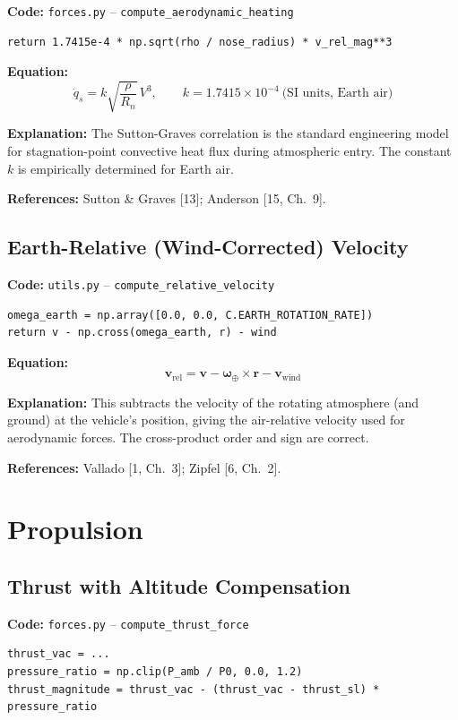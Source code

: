 \documentclass[12pt,a4paper]{article}
\begin{document}
\textbf{Code:} \texttt{forces.py} – \texttt{compute\_aerodynamic\_heating}
\begin{verbatim}
return 1.7415e-4 * np.sqrt(rho / nose_radius) * v_rel_mag**3
\end{verbatim}

\textbf{Equation:}
\[
\dot{q}_s = k\sqrt{\frac{\rho}{R_n}}\,V^3,\qquad k = 1.7415\times10^{-4}\ \text{(SI units, Earth air)}
\]

\textbf{Explanation:} The Sutton-Graves correlation is the standard engineering model for stagnation-point convective heat flux during atmospheric entry. The constant $k$ is empirically determined for Earth air.

\textbf{References:} Sutton \& Graves [13]; Anderson [15, Ch.~9].

\subsection{Earth-Relative (Wind-Corrected) Velocity}

\textbf{Code:} \texttt{utils.py} – \texttt{compute\_relative\_velocity}
\begin{verbatim}
omega_earth = np.array([0.0, 0.0, C.EARTH_ROTATION_RATE])
return v - np.cross(omega_earth, r) - wind
\end{verbatim}

\textbf{Equation:}
\[
\mathbf{v}_{\text{rel}} = \mathbf{v} - \boldsymbol{\omega}_{\oplus} \times \mathbf{r} - \mathbf{v}_{\text{wind}}
\]

\textbf{Explanation:} This subtracts the velocity of the rotating atmosphere (and ground) at the vehicle's position, giving the air-relative velocity used for aerodynamic forces. The cross-product order and sign are correct.

\textbf{References:} Vallado [1, Ch.~3]; Zipfel [6, Ch.~2].

\section{Propulsion}

\subsection{Thrust with Altitude Compensation}

\textbf{Code:} \texttt{forces.py} – \texttt{compute\_thrust\_force}
\begin{verbatim}
thrust_vac = ...
pressure_ratio = np.clip(P_amb / P0, 0.0, 1.2)
thrust_magnitude = thrust_vac - (thrust_vac - thrust_sl) * pressure_ratio
\end{verbatim}
\end{document}
